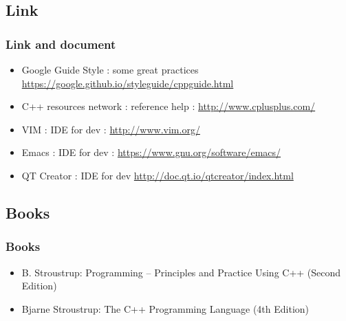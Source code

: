 \documentclass{beamer}
\begin{document}
\subsection{Link}
\label{sub:link}

\begin{frame}
	\frametitle{Link and document}
	\begin{itemize}
		\item Google Guide Style : some great practices \url{https://google.github.io/styleguide/cppguide.html}
		\item C++ resources network : reference help : \url{http://www.cplusplus.com/}
		\item VIM : IDE for dev : \url{http://www.vim.org/} 
		\item Emacs : IDE for dev : \url{https://www.gnu.org/software/emacs/} 
		\item QT Creator : IDE for dev \url{http://doc.qt.io/qtcreator/index.html} 
	\end{itemize}
\end{frame}

\subsection{Books}
\label{sub:books_}


\begin{frame}
	\frametitle{Books}
	\begin{itemize}
		\item B. Stroustrup: Programming -- Principles and Practice Using C++ (Second Edition)
		\item Bjarne Stroustrup: The C++ Programming Language (4th Edition)
	\end{itemize}
\end{frame}
\end{document}
